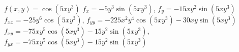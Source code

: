 {$f(x,y) = \cos(5xy^3)$
}
{$f_x=-5y^3\sin(5xy^3)$, $f_y=-15xy^2\sin(5xy^3)$\\
$f_{xx}=-25y^6\cos(5xy^3)$, $f_{yy}=-225x^2y^4\cos(5xy^3)-30xy\sin(5xy^3)$\\
$f_{xy}=-75xy^5\cos(5xy^3)-15y^2\sin(5xy^3)$, $f_{yx}=-75xy^5\cos(5xy^3)-15y^2\sin(5xy^3)$\\
}